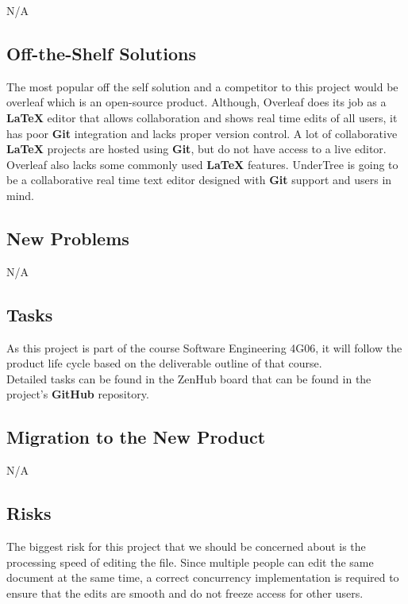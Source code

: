 \documentclass[12pt, titlepage]{article}
\begin{document}
	N/A
	
	\subsection{Off-the-Shelf Solutions}
	
	The most popular off the self solution and a competitor to this project would be overleaf which is an open-source product. Although, Overleaf does its job as a \textbf{LaTeX} editor that allows collaboration and shows real time edits of all users, it has poor \textbf{Git} integration and lacks proper version control. A lot of collaborative \textbf{LaTeX} projects are hosted using \textbf{Git}, but do not have access to a live editor. Overleaf also lacks some commonly used \textbf{LaTeX} features. UnderTree is going to be a collaborative real time text editor designed with \textbf{Git} support and users in mind.
	
	\subsection{New Problems}
	
	N/A
	
	\subsection{Tasks}
	
	As this project is part of the course Software Engineering 4G06, it will follow the product life cycle based on the deliverable outline of that course.\\
	Detailed tasks can be found in the ZenHub board that can be found in the project's \textbf{GitHub} repository.
	
	\subsection{Migration to the New Product}
	N/A
	
	\subsection{Risks}
	
	The biggest risk for this project that we should be concerned about is the processing speed of editing the file. Since multiple people can edit the same document at the same time, a correct concurrency implementation is required to ensure that the edits are smooth and do not freeze access for other users.
	
\end{document}
